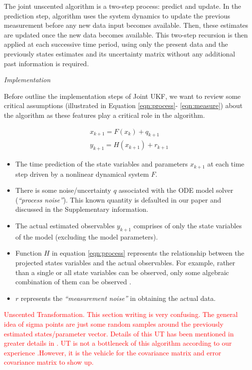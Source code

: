 \documentclass[review]{elsarticle}
\begin{document}
The joint unscented algorithm is a two-step process: predict and update. In the prediction step, algorithm uses the system dynamics to update the previous measurement before any new data input becomes available. 
Then, these estimates are updated once the new data becomes available. This two-step recursion is then applied at each successive time period, using only the present data and the previously states estimates and its uncertainty matrix without any additional past information is required.  



{\it Implementation}

Before outline the implementation steps of Joint UKF, we want to review some critical assumptions (illustrated in Equation \eqref{eqn:process}- \eqref{eqn:measure}) about the algorithm as these features play a critical role in the algorithm. 


\begin{align}
    &x_{k+1} = F(x_k) + q_{k+1} \label{eqn:process}\\
    &y_{k+1} = H(x_{k+1}) + r_{k+1}  \label{eqn:measure}
\end{align}


\begin{itemize}
\item The time prediction of the state variables and parameters $x_{k+1}$ at each time step driven by a nonlinear dynamical system $F$.
\item There is some noise/uncertainty $q$ associated with the ODE model solver ({\it ``process noise''}). This known quantity is defaulted in our paper and discussed in the Supplementary information. 
\item The actual estimated observables $y_{k+1}$ comprises of only the state variables of the model (excluding the model parameters). 
\item Function $H$ in equation \eqref{eqn:process} represents the relationship between the projected states variables and the actual observables. For example, rather than a single or all state variables can be observed, only some algebraic combination of them can be observed \cite{SimonHaykinText}.
\item $r$ represents the {\it ``measurement noise''} in obtaining the actual data.   
\end{itemize}

  
  \textcolor{red}{Unscented Transformation. This section writing is very confusing. The general idea of sigma points are just some random samples around the previously estimated states/parameter vector. Details of this UT has been mentioned in greater details in \cite{albers2017personalized,GoveHollingerDual,ChowFerrer}. UT is not a bottleneck of this algorithm according to our experience .However, it is the vehicle for the covariance matrix and error covariance matrix to show up.}
\end{document}
